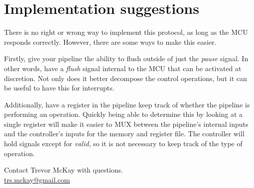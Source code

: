 \documentclass[10pt,a4paper]{article}
\begin{document}
\newpage
\section{Implementation suggestions}
There is no right or wrong way to implement this protocol, as long as the MCU responds correctly.
However, there are some ways to make this easier.

Firstly, give your pipeline the ability to flush
outside of just the \emph{pause} signal. In other words, have a \emph{flush} signal internal to the
MCU that can be activated at discretion. Not only does it better decompose the control operations,
but it can be useful to have this for interrupts.

Additionally, have a register in the pipeline keep track of whether the pipeline is performing an
operation. Quickly being able to determine this by looking at a single register
will make it easier to MUX between the pipeline's internal inputs and the controller's inputs for
the memory and register file. The controller will hold signals except for \emph{valid}, so it is not
necessary to keep track of the type of operation.

\vspace*{\fill}
\begin{center}
    \noindent Contact Trevor McKay with questions.\\
    \href{mailto:trs.mckay@gmail.com}{trs.mckay@gmail.com}
\end{center}
\end{document}
